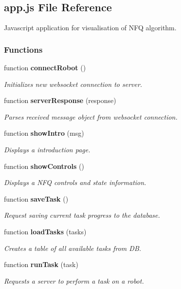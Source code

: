 \subsection{app.\+js File Reference}
\label{app_8js}


Javascript application for visualisation of N\+F\+Q algorithm.  


\subsubsection*{Functions}
\begin{DoxyCompactItemize}
\item 
function {\bf connect\+Robot} ()
\begin{DoxyCompactList}\small\item\em Initializes new websocket connection to server. \end{DoxyCompactList}\item 
function {\bf server\+Response} (response)
\begin{DoxyCompactList}\small\item\em Parses received message object from websocket connection. \end{DoxyCompactList}\item 
function {\bf show\+Intro} (msg)
\begin{DoxyCompactList}\small\item\em Displays a introduction page. \end{DoxyCompactList}\item 
function {\bf show\+Controls} ()
\begin{DoxyCompactList}\small\item\em Displays a N\+F\+Q controls and state information. \end{DoxyCompactList}\item 
function {\bf save\+Task} ()
\begin{DoxyCompactList}\small\item\em Request saving current task progress to the database. \end{DoxyCompactList}\item 
function {\bf load\+Tasks} (tasks)
\begin{DoxyCompactList}\small\item\em Creates a table of all available tasks from D\+B. \end{DoxyCompactList}\item 
function {\bf run\+Task} (task)
\begin{DoxyCompactList}\small\item\em Requests a server to perform a task on a robot. \end{DoxyCompactList}\item 

\end{DoxyCompactItemize}
